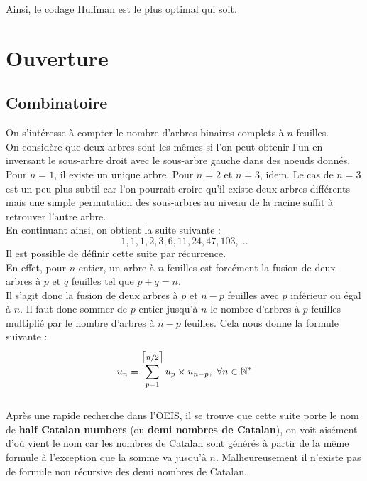 \documentclass[a4paper, 12pt]{article}
\DeclarePairedDelimiter{\ceil}{\lceil}{\rceil}
\begin{document}
Ainsi, le codage Huffman est le plus optimal qui soit.

\newpage

\section{Ouverture}

\subsection{Combinatoire}
On s'intéresse à compter le nombre d'arbres binaires complets à $n$ feuilles. \\
On considère que deux arbres sont les mêmes si l'on peut obtenir l'un en inversant le sous-arbre droit avec le sous-arbre gauche dans des noeuds donnés. \\
Pour $n = 1$, il existe un unique arbre. Pour $n = 2$ et $n = 3$, idem. Le cas de $n = 3$ est un peu plus subtil car l'on pourrait croire qu'il existe deux arbres différents mais une simple permutation des sous-arbres au niveau de la racine suffit à retrouver l'autre arbre. \\
En continuant ainsi, on obtient la suite suivante : \\
$$
1, 1, 1, 2, 3, 6, 11, 24, 47, 103, ...
$$
Il est possible de définir cette suite par récurrence. \\
En effet, pour $n$ entier, un arbre à $n$ feuilles est forcément la fusion de deux arbres à $p$ et $q$ feuilles tel que $p+q = n$. \\
Il s'agit donc la fusion de deux arbres à $p$ et $n-p$ feuilles avec $p$ inférieur ou égal à $n$.
Il faut donc sommer de $p$ entier jusqu'à $n$ le nombre d'arbres à $p$ feuilles multiplié par le nombre d'arbres à $n-p$ feuilles.
Cela nous donne la formule suivante :
$$
u_n = \sum_{p = 1}^{\ceil[\big]{n/2}} u_p\times u_{n-p},\ \forall n \in \mathbb{N}^*
$$
\\
Après une rapide recherche dans l'OEIS, il se trouve que cette suite porte le nom de \textbf{half Catalan numbers} (ou \textbf{demi nombres de Catalan}), on voit aisément d'où vient le nom car les nombres de Catalan sont générés à partir de la même formule à l'exception que la somme va jusqu'à $n$. Malheureusement il n'existe pas de formule non récursive des demi nombres de Catalan.
\end{document}
